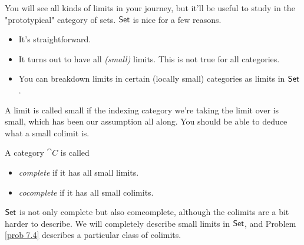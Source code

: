 
\begin{discussion}
You will see all kinds of limits in your journey, but it'll be useful to study in the "prototypical" category of sets. $\mathsf{Set}$ is nice for a few reasons.
\begin{itemize}
\item It's straightforward.
\item It turns out to have all \emph{(small)} limits. This is not true for all categories.
\item You can breakdown limits in certain (locally small) categories as limits in $\mathsf{Set}$.
\end{itemize}
A limit is called small if the indexing category we're taking the limit over is small, which has been our assumption all along. You should be able to deduce what a small colimit is.
\end{discussion}

\vspace*{0.1in}

\begin{definition}
A category $\cat{C}$ is called
\begin{itemize}
\item \emph{complete} if it has all small limits.
\item \emph{cocomplete} if it has all small colimits.
\end{itemize}
$\mathsf{Set}$ is not only complete but also comcomplete, although the colimits are a bit harder to describe. We will completely describe small limits in $\mathsf{Set}$, and Problem \ref{prob 7.4} describes a particular class of colimits.
\end{definition}

\vspace*{0.1in}

